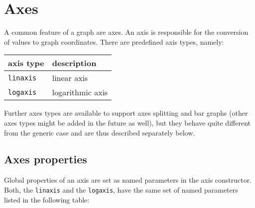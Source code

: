 \section{Axes}
\label{graph:axes}

A common feature of a graph are axes. An axis is responsible for the
conversion of values to graph coordinates. There are predefined axis
types, namely:
\begin{center}
\begin{tabular}{ll}
axis type&description\\
\hline
\texttt{linaxis}&linear axis\\
\texttt{logaxis}&logarithmic axis\\
\end{tabular}
\end{center}

Further axes types are available to support axes splitting and bar
graphs (other axes types might be added in the future as well), but
they behave quite different from the generic case and are thus
described separately below.

\subsection{Axes properties}

Global properties of an axis are set as named parameters in the axis
constructor. Both, the \verb|linaxis| and the \verb|logaxis|, have the
same set of named parameters listed in the following table:

